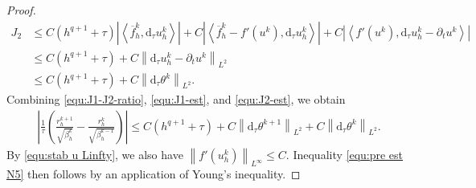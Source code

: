 \documentclass[10pt,a4paper]{amsart}
\newcommand{\abs}[1]{\left|{#1}\right|}
\newcommand{\dtt}{\mathrm{d}_\tau}
\newcommand{\inpro}[2]{\left\langle#1,#2\right\rangle}
\newcommand{\norm}[2]{\left\|{#1}\right\|_{#2}}
\begin{document}
\begin{proof}
\begin{align}
		J_2
		&\leq
		C(h^{q+1}+\tau)
		\abs{\inpro{\overline f_h^k}{\dtt u_h^k}}
		+
		C\abs{\inpro{\overline f_h^k-f'(u^k)}{\dtt u_h^k}}
		+
		C\abs{\inpro{f'(u^k)}{\dtt u_h^k-\partial_t u^k}}
		\nonumber\\
		&\leq
		C(h^{q+1}+\tau)
		+
		C\norm{\dtt u_h^k-\partial_t u^k}{L^2}
		\nonumber\\
		&\leq
		C(h^{q+1}+\tau)
		+
		C\norm{\dtt\theta^k}{L^2}.
		\label{equ:J2-est}
	\end{align}
	Combining \eqref{equ:J1-J2-ratio}, \eqref{equ:J1-est}, and
	\eqref{equ:J2-est}, we obtain
	\begin{align}
		\label{equ:ratio-pre-est}
		\abs{
			\frac{1}{\tau}
			\left(
			\frac{r_h^{k+1}}{\sqrt{\beta_h^k}}
			-
			\frac{r_h^k}{\sqrt{\beta_h^{k-1}}}
			\right)}
		\leq
		C(h^{q+1}+\tau)
		+
		C\norm{\dtt\theta^{k+1}}{L^2}
		+
		C\norm{\dtt\theta^k}{L^2}.
	\end{align}
	By \eqref{equ:stab u Linfty}, we also have
	$\norm{f'(u_h^k)}{L^\infty}\le C$. Inequality \eqref{equ:pre est N5} then follows by an application of Young's inequality.


\end{proof}
\end{document}
